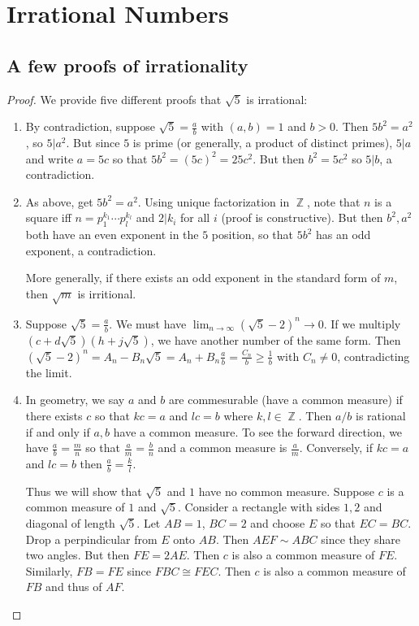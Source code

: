 \documentclass[12pt, a4paper]{book}
\DeclareMathOperator{\Z}{\mathbb{Z}}
\theoremstyle{nonumberplain}
\newtheorem{proof}{Proof}
\begin{document}
\section{Irrational Numbers}
\subsection{A few proofs of irrationality}
\begin{proof}
    We provide five different proofs that $\sqrt{5}$ is irrational:
    \begin{enumerate}
        \item By contradiction, suppose $\sqrt{5}=\frac{a}{b}$ with $(a,b)=1$ and $b>0$.
            Then $5b^2=a^2$, so $5|a^2$.
            But since $5$ is prime (or generally, a product of distinct primes), $5|a$ and write $a=5c$ so that $5b^2=(5c)^2=25c^2$.
            But then $b^2=5c^2$ so $5|b$, a contradiction.
        \item As above, get $5b^2=a^2$.
            Using unique factorization in $\Z$, 
            note that $n$ is a square iff $n=p_1^{k_1}\cdots p_l^{k_l}$ and $2|k_i$ for all $i$ (proof is constructive).
            But then $b^2,a^2$ both have an even exponent in the $5$ position, so that $5b^2$ has an odd exponent, a contradiction.

            More generally, if there exists an odd exponent in the standard form of $m$, then $\sqrt{m}$ is irritional.
        \item Suppose $\sqrt{5}=\frac{a}{b}$.
            We must have $\lim_{n\to\infty}(\sqrt{5}-2)^n\to 0$.
            If we multiply $(c+d\sqrt{5})(h+j\sqrt{5})$, we have another number of the same form.
            Then $(\sqrt{5}-2)^n=A_n-B_n\sqrt{5}=A_n+B_n\frac{a}{b}=\frac{C_n}{b}\geq\frac{1}{b}$ with $C_n\neq 0$, contradicting the limit.
        \item In geometry, we say $a$ and $b$ are commesurable (have a common measure) if there exists $c$ so that $kc=a$ and $lc=b$ where $k,l\in\Z$.
            Then $a/b$ is rational if and only if $a,b$ have a common measure.
            To see the forward direction, we have $\frac{a}{b}=\frac{m}{n}$ so that $\frac{a}{m}=\frac{b}{n}$ and a common measure is $\frac{a}{m}$.
            Conversely, if $kc=a$ and $lc=b$ then $\frac{a}{b}=\frac{k}{l}$.

            Thus we will show that $\sqrt{5}$ and $1$ have no common measure.
            Suppose $c$ is a common measure of $1$ and $\sqrt{5}$.
            Consider a rectangle with sides $1,2$ and diagonal of length $\sqrt{5}$.
            Let $AB=1$, $BC=2$ and choose $E$ so that $EC=BC$.
            Drop a perpindicular from $E$ onto $AB$.
            Then $AEF\sim ABC$ since they share two angles.
            But then $FE=2AE$.
            Then $c$ is also a common measure of $FE$.
            Similarly, $FB=FE$ since $FBC\cong FEC$.
            Then $c$ is also a common measure of $FB$ and thus of $AF$.


\end{enumerate}
\end{proof}
\end{document}
